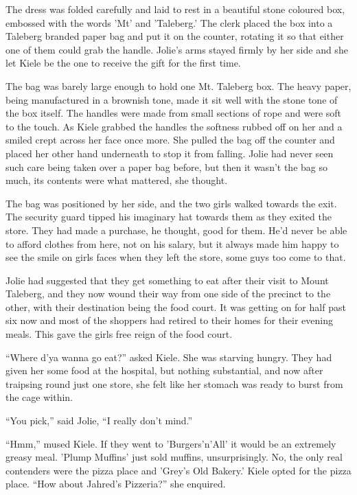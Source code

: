The dress was folded carefully and laid to rest in a beautiful stone coloured box, embossed with the words 'Mt' and 'Taleberg.'  The clerk placed the box into a Taleberg branded paper bag and put it on the counter, rotating it so that either one of them could grab the handle.  Jolie's arms stayed firmly by her side and she let Kiele be the one to receive the gift for the first time.  

The bag was barely large enough to hold one Mt. Taleberg box.  The heavy paper, being manufactured in a brownish tone, made it sit well with the stone tone of the box itself.  The handles were made from small sections of rope and were soft to the touch.  As Kiele grabbed the handles the softness rubbed off on her and a smiled crept across her face once more.  She pulled the bag off the counter and placed her other hand underneath to stop it from falling.  Jolie had never seen such care being taken over a paper bag before, but then it wasn't the bag so much, its contents were what mattered, she thought.

The bag was positioned by her side, and the two girls walked towards the exit.  The security guard tipped his imaginary hat towards them as they exited the store.  They had made a purchase, he thought, good for them.  He'd never be able to afford clothes from here, not on his salary, but it always made him happy to see the smile on girls faces when they left the store, some guys too come to that.

Jolie had suggested that they get something to eat after their visit to Mount Taleberg, and they now wound their way from one side of the precinct to the other, with their destination being the food court.  It was getting on for half past six now and most of the shoppers had retired to their homes for their evening meals.  This gave the girls free reign of the food court.

``Where d'ya wanna go eat?'' asked Kiele.  She was starving hungry.  They had given her some food at the hospital, but nothing substantial, and now after traipsing round just one store, she felt like her stomach was ready to burst from the cage within.

``You pick,'' said Jolie, ``I really don't mind.''  

``Hmm,'' mused Kiele.   If they went to 'Burgers'n'All' it would be an extremely greasy meal.  'Plump Muffins' just sold muffins, unsurprisingly.  No, the only real contenders were the pizza place and 'Grey's Old Bakery.'  Kiele opted for the pizza place.  ``How about Jahred's Pizzeria?''  she enquired.  

